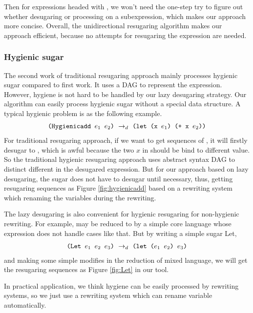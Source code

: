 Then for expressions headed with , we won't need the one-step try to figure out whether desugaring or processing on a subexpression, which makes our approach more concise. Overall, the unidirectional resugaring algorithm makes our approach efficient, because no attempts for resugaring the expression are needed.
\subsubsection{Hygienic sugar}
\label{mark:hygienic}


The second work\cite{hygienic} of traditional resugaring approach mainly processes hygienic sugar compared to first work. It uses a DAG to represent the expression. However, hygiene is not hard to be handled by our lazy desugaring strategy. Our algorithm can easily process hygienic sugar without a special data structure.
A typical hygienic problem is as the following example.
\[
\texttt{(Hygienicadd $e_1$ $e_2$)} ~\rightarrow_d~ \texttt{(let (x $e_1$) (+ x $e_2$))}
\]
For traditional resugaring approach, if we want to get sequences of , it will firstly desugar to , which is awful because the two $x$ in  should be bind to different value. So the traditional hygienic resugaring approach uses abstract syntax DAG to distinct different  in the desugared expression. But for our approach based on lazy desugaring, the  sugar does not have to desugar until necessary, thus, getting resugaring sequences as Figure \ref{fig:hygienicadd} based on a  rewriting system which renaming the variables during the rewriting.


The lazy desugaring is also convenient for hygienic resugaring for non-hygienic rewriting. For example,  may be reduced to  by a simple core language whose  expression does not handle cases like that. But by writing a simple sugar Let,
\[\texttt{(Let~$e_1$~$e_2$~$e_3$)} ~\rightarrow_d~ \texttt{(let~($e_1$~$e_2$)~$e_3$)}\]
and making some simple modifies in the reduction of mixed language, we will get the resugaring sequences as Figure \ref{fig:Let} in our tool.


In practical application, we think hygiene can be easily processed by rewriting systems, so we just use a rewriting system which can rename variable automatically.

